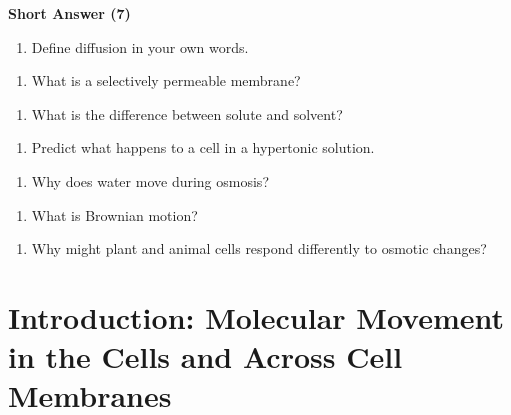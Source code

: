 \documentclass[
  letterpaper,
  DIV=11,
  numbers=noendperiod]{scrreprt}
\providecommand{\tightlist}{%
  \setlength{\itemsep}{0pt}\setlength{\parskip}{0pt}}
\begin{document}
\textbf{Short Answer (7)}

\begin{enumerate}
\def\labelenumi{\arabic{enumi}.}
\setcounter{enumi}{8}
\tightlist
\item
  Define diffusion in your own words.
\end{enumerate}

\begin{enumerate}
\def\labelenumi{\arabic{enumi}.}
\setcounter{enumi}{9}
\tightlist
\item
  What is a selectively permeable membrane?
\end{enumerate}

\begin{enumerate}
\def\labelenumi{\arabic{enumi}.}
\setcounter{enumi}{10}
\tightlist
\item
  What is the difference between solute and solvent?
\end{enumerate}

\begin{enumerate}
\def\labelenumi{\arabic{enumi}.}
\setcounter{enumi}{11}
\tightlist
\item
  Predict what happens to a cell in a hypertonic solution.
\end{enumerate}

\begin{enumerate}
\def\labelenumi{\arabic{enumi}.}
\setcounter{enumi}{12}
\tightlist
\item
  Why does water move during osmosis?
\end{enumerate}

\begin{enumerate}
\def\labelenumi{\arabic{enumi}.}
\setcounter{enumi}{13}
\tightlist
\item
  What is Brownian motion?
\end{enumerate}

\begin{enumerate}
\def\labelenumi{\arabic{enumi}.}
\setcounter{enumi}{14}
\tightlist
\item
  Why might plant and animal cells respond differently to osmotic
  changes?
\end{enumerate}

\section{\texorpdfstring{\textbf{Introduction: Molecular Movement in the
Cells and Across Cell
Membranes}}{Introduction: Molecular Movement in the Cells and Across Cell Membranes}}\label{introduction-molecular-movement-in-the-cells-and-across-cell-membranes}
\end{document}

